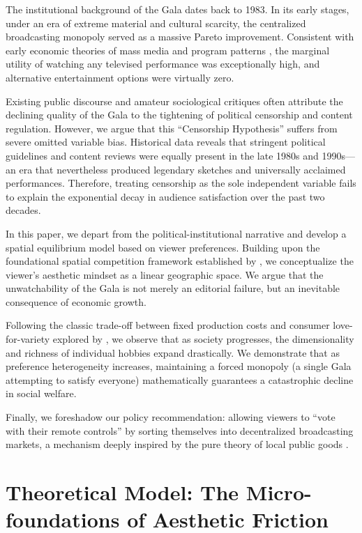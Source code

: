 \documentclass[AER]{AEA}
\begin{document}
The institutional background of the Gala dates back to 1983. In its early stages, under an era of extreme material and cultural scarcity, the centralized broadcasting monopoly served as a massive Pareto improvement. Consistent with early economic theories of mass media and program patterns \citep{steiner1952}, the marginal utility of watching any televised performance was exceptionally high, and alternative entertainment options were virtually zero.

Existing public discourse and amateur sociological critiques often attribute the declining quality of the Gala to the tightening of political censorship and content regulation. However, we argue that this ``Censorship Hypothesis'' suffers from severe omitted variable bias. Historical data reveals that stringent political guidelines and content reviews were equally present in the late 1980s and 1990s—an era that nevertheless produced legendary sketches and universally acclaimed performances. Therefore, treating censorship as the sole independent variable fails to explain the exponential decay in audience satisfaction over the past two decades.

In this paper, we depart from the political-institutional narrative and develop a spatial equilibrium model based on viewer preferences. Building upon the foundational spatial competition framework established by \citet{hotelling1929}, we conceptualize the viewer's aesthetic mindset as a linear geographic space. We argue that the unwatchability of the Gala is not merely an editorial failure, but an inevitable consequence of economic growth.

Following the classic trade-off between fixed production costs and consumer love-for-variety explored by \citet{dixit1977}, we observe that as society progresses, the dimensionality and richness of individual hobbies expand drastically. We demonstrate that as preference heterogeneity increases, maintaining a forced monopoly (a single Gala attempting to satisfy everyone) mathematically guarantees a catastrophic decline in social welfare.

Finally, we foreshadow our policy recommendation: allowing viewers to ``vote with their remote controls'' by sorting themselves into decentralized broadcasting markets, a mechanism deeply inspired by the pure theory of local public goods \citep{tiebout1956}.

\section{Theoretical Model: The Micro-foundations of Aesthetic Friction}
\end{document}
